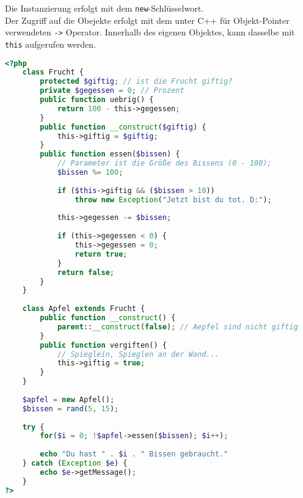 Die Instanzierung erfolgt mit dem \texttt{new}-Schlüsselwort.\\
Der Zugriff auf die Obejekte erfolgt mit dem unter C++ für Objekt-Pointer verwendeten \texttt{->} Operator. Innerhalb des eigenen Objektes, kann dasselbe mit \texttt{this} aufgerufen werden.
\begin{lstlisting}[style=custom, language=PHP,  caption={Beispiel: OOP in PHP},label={lst:content_php_php}]
<?php 
	class Frucht {
		protected $giftig; // ist die Frucht giftig?
		private $gegessen = 0; // Prozent
		public function uebrig() {
			return 100 - this->gegessen;
		}
		public function __construct($giftig) {
			this->giftig = $giftig;
		}
		public function essen($bissen) {
			// Parameter ist die Größe des Bissens (0 - 100);
			$bissen %= 100; 
			
			if ($this->giftig && ($bissen > 10))
				throw new Exception("Jetzt bist du tot. D:");
				
			this->gegessen -= $bissen;
			
			if (this->gegessen < 0) {
				this->gegessen = 0;
				return true;
			}
			return false;
		}
	}
	
	class Apfel extends Frucht {
		public function __construct() {
			parent::__construct(false); // Aepfel sind nicht giftig
		}
		public function vergiften() {
			// Spieglein, Spieglen an der Wand...
			this->giftig = true;
		}
	}
	
	$apfel = new Apfel();
	$bissen = rand(5, 15);
	
	try {
		for($i = 0; !$apfel->essen($bissen); $i++);
		
		echo "Du hast " . $i . " Bissen gebraucht."
	} catch (Exception $e) {
		echo $e->getMessage();
	}
?>
\end{lstlisting}